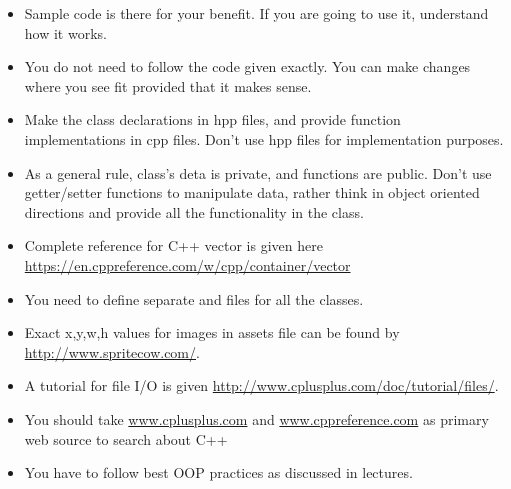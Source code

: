 \documentclass[a4paper,12pt]{article}
\begin{document}
\begin{itemize}
	\item Sample code is there for your benefit. If you are going to use it, understand how it works.
	\item You do not need to follow the code given exactly. You can make changes where you see fit provided that it makes sense.
	\item Make the class declarations in hpp files, and provide function implementations in cpp files. Don't use hpp files for implementation purposes.
	\item As a general rule, class's deta is private, and functions are public. Don't use getter/setter functions to manipulate data, rather think in object oriented directions and provide all the functionality in the class.
	\item Complete reference for C++ vector is given here \url{https://en.cppreference.com/w/cpp/container/vector}
	\item You need to define separate  and  files for all the classes.
	\item Exact x,y,w,h values for images in assets file can be found by \url{http://www.spritecow.com/}.
	\item A tutorial for file I/O is given \url{http://www.cplusplus.com/doc/tutorial/files/}.
	\item You should take \url{www.cplusplus.com} and \url{www.cppreference.com} as primary web source to search about C++
	\item You have to follow best OOP practices as discussed in lectures.
\end{itemize}
\end{document}
